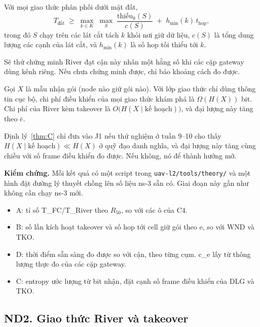 \setcounter{proposition}{3}
\begin{proposition}\label{prop:D}
Với mọi giao thức phân phối dưới mặt đất,
\[
T_{\text{đất}}\;\ge\;\max_{k\in K}\;\max_{S}\;\frac{\mathrm{thiếu}_k(S)}{c(S)}\;+\;h_{\min}(k)\,t_{\text{hop}},
\]
trong đó $S$ chạy trên các lát cắt tách $k$ khỏi nơi giữ dữ liệu, $c(S)$ là tổng dung lượng các cạnh của lát cắt, và $h_{\min}(k)$ là số hop tối thiểu tới $k$.
\end{proposition}
\noindent Sẽ thử chứng minh River đạt cận này nhân một hằng số khi các cặp gateway dùng kênh riêng. Nếu chưa chứng minh được, chỉ báo khoảng cách đo được.

\setcounter{theorem}{2}
\begin{theorem}\label{thm:C}
Gọi $X$ là mẫu nhận gói (node nào giữ gói nào). Với lớp giao thức chỉ dùng thông tin cục bộ, chi phí điều khiển của mọi giao thức khám phá là $\Omega(H(X))$ bit. Chi phí của River kèm takeover là $O\big(H(X\mid\text{kế hoạch})\big)$, và đại lượng này tăng theo $\bar e$.
\end{theorem}
\noindent Định lý~\ref{thm:C} chỉ đưa vào J1 nếu thử nghiệm ở tuần 9–10 cho thấy $H(X\mid\text{kế hoạch})\ll H(X)$ ở quỹ đạo danh nghĩa, và đại lượng này tăng cùng chiều với số frame điều khiển đo được. Nếu không, nó để thành hướng mở.

\textbf{Kiểm chứng.} Mỗi kết quả có một script trong
\texttt{uav-l2/tools/theory/} và một hình đặt đường lý thuyết chồng lên
số liệu ns-3 sẵn có. Giai đoạn này gần như không cần chạy ns-3 mới.

\begin{itemize}
\tightlist
\item
  A: tỉ số T\_FC/T\_River theo $R_{50}$, so với các ô của C4.
\item
  B: số lần kích hoạt takeover và số hop tới cell giữ gói theo e, so với
  WND và TKO.
\item
  D: thời điểm sẵn sàng đo được so với cận, theo từng cụm. c\_e lấy từ
  thông lượng thực đo của các cặp gateway.
\item
  C: entropy ước lượng từ bit nhận, đặt cạnh số frame điều khiển của DLG
  và TKO.
\end{itemize}

\subsection{ND2. Giao thức River và takeover}

